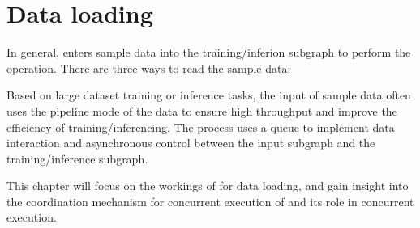 \begin{savequote}[45mm]
\end{savequote}


\chapter{Data loading} 
\label{ch:input-pipeline}
\begin{content}
In general,  enters sample data into the training/inferion subgraph to perform the operation. There are three ways to read the sample data:

\begin{enum}
\end{enum}

Based on large dataset training or inference tasks, the input of sample data often uses the pipeline mode of the data to ensure high throughput and improve the efficiency of training/inferencing. The process uses a queue to implement data interaction and asynchronous control between the input subgraph and the training/inference subgraph.

This chapter will focus on the workings of  for data loading, and gain insight into the coordination mechanism for concurrent execution of  and its role in concurrent execution.
\end{content}


